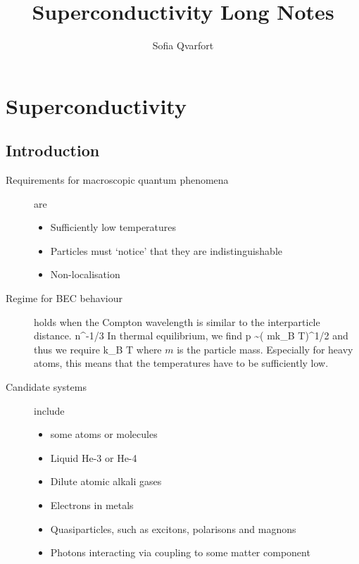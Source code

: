 


\title{Superconductivity Long Notes}
\author{Sofia Qvarfort}
\maketitle
\tableofcontents

\section{Superconductivity}
\subsection{Introduction}
\begin{description}
\item[Requirements for macroscopic quantum phenomena] are
\begin{itemize}
\item Sufficiently low temperatures
\item Particles must `notice' that they are indistinguishable 
\item Non-localisation 
\end{itemize}

\item[Regime for BEC behaviour] holds when the Compton wavelength is similar to the interparticle distance. 
\beq
\lambda \geq n^{-1/3}
\eeq
In thermal equilibrium, we find
\beq
p \sim \left( mk_B T\right)^{1/2}
\eeq
and thus we require
\beq
k_B T \leq {}
\eeq
where $m$ is the particle mass. 
Especially for heavy atoms, this means that the temperatures have to be sufficiently low. 

\item[Candidate systems] include
\begin{itemize}
\item some atoms or molecules
\item Liquid  He-3 or He-4
\item Dilute atomic alkali gases
\item Electrons in metals
\item Quasiparticles, such as excitons, polarisons and magnons
\item Photons interacting via coupling to some matter component
\end{itemize}


\end{description}


